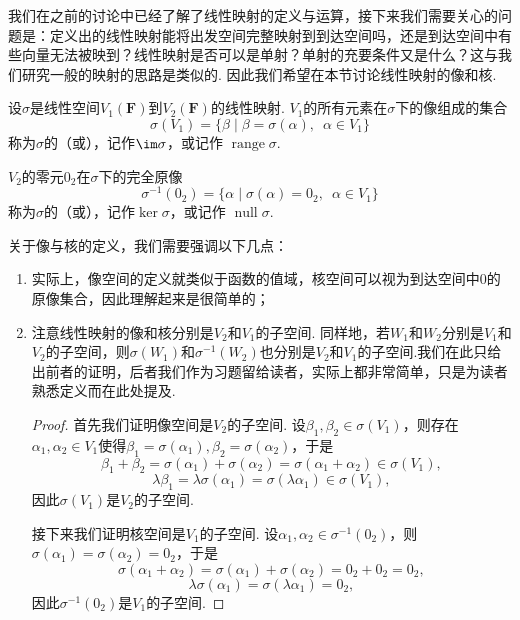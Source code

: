 我们在之前的讨论中已经了解了线性映射的定义与运算，接下来我们需要关心的问题是：定义出的线性映射能将出发空间完整映射到到达空间吗，还是到达空间中有些向量无法被映到？线性映射是否可以是单射？单射的充要条件又是什么？这与我们研究一般的映射的思路是类似的. 因此我们希望在本节讨论线性映射的像和核.
\begin{definition}{}{}
    设$\sigma$是线性空间$V_1(\mathbf{F})$到$V_2(\mathbf{F})$的线性映射. $V_1$的所有元素在$\sigma$下的像组成的集合
    \[\sigma(V_1)=\{\beta \mid \beta=\sigma(\alpha),\enspace \alpha \in V_1\}\]
    称为$\sigma$的（或），记作$\im \sigma$，或记作 $\operatorname{range}\sigma$.

    $V_2$的零元$0_2$在$\sigma$下的完全原像
    \[\sigma^{-1}(0_2)=\{\alpha \mid \sigma(\alpha)=0_2,\enspace \alpha \in V_1\}\]
    称为$\sigma$的（或），记作$\ker \sigma$，或记作 $\operatorname{null}\sigma$.
\end{definition}

关于像与核的定义，我们需要强调以下几点：
\begin{enumerate}
    \item 实际上，像空间的定义就类似于函数的值域，核空间可以视为到达空间中0的原像集合，因此理解起来是很简单的；

    \item 注意线性映射的像和核分别是$V_2$和$V_1$的子空间. 同样地，若$W_1$和$W_2$分别是$V_1$和$V_2$的子空间，则$\sigma(W_1)$和$\sigma^{-1}(W_2)$也分别是$V_2$和$V_1$的子空间.我们在此只给出前者的证明，后者我们作为习题留给读者，实际上都非常简单，只是为读者熟悉定义而在此处提及.
          \begin{proof}
              首先我们证明像空间是$V_2$的子空间. 设$\beta_1,\beta_2\in \sigma(V_1)$，则存在$\alpha_1,\alpha_2\in V_1$使得$\beta_1=\sigma(\alpha_1),\beta_2=\sigma(\alpha_2)$，于是
              \[\beta_1+\beta_2=\sigma(\alpha_1)+\sigma(\alpha_2)=\sigma(\alpha_1+\alpha_2)\in \sigma(V_1),\]
              \[\lambda\beta_1=\lambda\sigma(\alpha_1)=\sigma(\lambda\alpha_1)\in \sigma(V_1),\]
              因此$\sigma(V_1)$是$V_2$的子空间.

              接下来我们证明核空间是$V_1$的子空间. 设$\alpha_1,\alpha_2\in \sigma^{-1}(0_2)$，则$\sigma(\alpha_1)=\sigma(\alpha_2)=0_2$，于是
              \[\sigma(\alpha_1+\alpha_2)=\sigma(\alpha_1)+\sigma(\alpha_2)=0_2+0_2=0_2,\]
              \[\lambda\sigma(\alpha_1)=\sigma(\lambda\alpha_1)=0_2,\]
              因此$\sigma^{-1}(0_2)$是$V_1$的子空间.
          \end{proof}
\end{enumerate}

